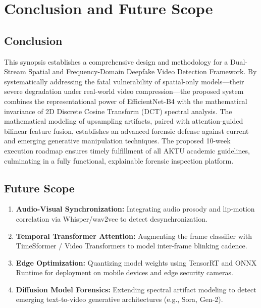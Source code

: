 \documentclass[12pt,a4paper]{report}
\begin{document}
\chapter{Conclusion and Future Scope}

\section{Conclusion}
This synopsis establishes a comprehensive design and methodology for a Dual-Stream Spatial and Frequency-Domain Deepfake Video Detection Framework. By systematically addressing the fatal vulnerability of spatial-only models---their severe degradation under real-world video compression---the proposed system combines the representational power of EfficientNet-B4 with the mathematical invariance of 2D Discrete Cosine Transform (DCT) spectral analysis. The mathematical modeling of upsampling artifacts, paired with attention-guided bilinear feature fusion, establishes an advanced forensic defense against current and emerging generative manipulation techniques. The proposed 10-week execution roadmap ensures timely fulfillment of all AKTU academic guidelines, culminating in a fully functional, explainable forensic inspection platform.

\section{Future Scope}
\begin{enumerate}
    \item \textbf{Audio-Visual Synchronization:} Integrating audio prosody and lip-motion correlation via Whisper/wav2vec to detect desynchronization.
    \item \textbf{Temporal Transformer Attention:} Augmenting the frame classifier with TimeSformer / Video Transformers to model inter-frame blinking cadence.
    \item \textbf{Edge Optimization:} Quantizing model weights using TensorRT and ONNX Runtime for deployment on mobile devices and edge security cameras.
    \item \textbf{Diffusion Model Forensics:} Extending spectral artifact modeling to detect emerging text-to-video generative architectures (e.g., Sora, Gen-2).
\end{enumerate}

\newpage
\end{document}
